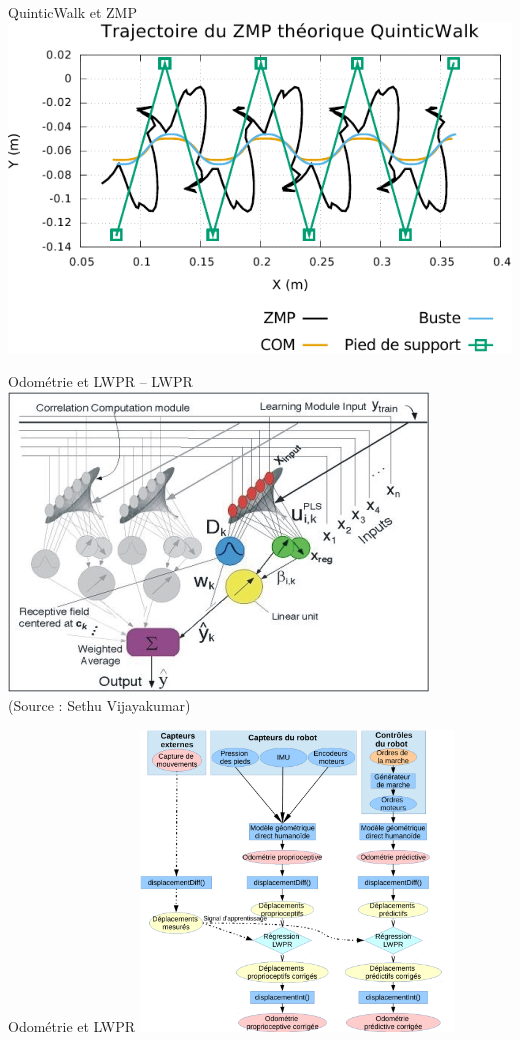 

\begin{frame}[noframenumbering]{QuinticWalk et ZMP}
    \centering
    \includegraphics[type=pdf,ext=.pdf,read=.pdf,width=1.0\linewidth]{../plot/walk_quintic_zmp}
\end{frame}

\begin{frame}[noframenumbering]{Odométrie et LWPR -- LWPR}
    \centering
    \includegraphics[width=0.6\linewidth]{../media/lwpr.jpg}\\
    \scriptsize
    (Source : Sethu Vijayakumar)
\end{frame}

\begin{frame}[noframenumbering]{Odométrie et LWPR}
    \centering
    \includegraphics[type=pdf,ext=.pdf,read=.pdf,height=8.0cm]{../schema/architecture}
\end{frame}

